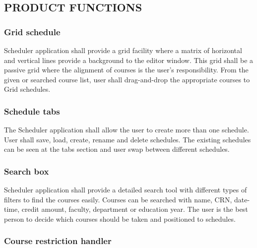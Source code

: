 \documentclass[twoside,letterpaper]{article}
\begin{document}
\subsection[PRODUCT
FUNCTIONS]{\rmfamily\bfseries\color{black}
PRODUCT FUNCTIONS}

\subsubsection[Grid schedules
]{\rmfamily\bfseries\color{black}
Grid schedule}

{\color{black}
Scheduler application shall provide a grid facility where a matrix of horizontal and vertical lines provide a background to the editor window. This grid shall be a passive grid where the alignment of courses is the user's responsibility. From the given or searched course list, user shall drag-and-drop the appropriate courses to Grid schedules. }


\subsubsection[Schedule tabs
]{\rmfamily\bfseries\color{black}
	Schedule tabs}

{\color{black}
	The Scheduler application shall allow the user to create more than one schedule. User shall save, load, create, rename and delete schedules. The existing schedules can be seen at the tabs section and user swap between different schedules.}

\subsubsection[Search box
]{\rmfamily\bfseries\color{black}
	Search box}

{\color{black}
	Scheduler application shall provide a detailed search tool with different types of filters to find the courses easily. Courses can be searched with name, CRN, date-time, credit amount, faculty, department or education year. The user is the best person to decide which courses should be taken and positioned to schedules. }

\subsubsection[Course restriction handler]{\rmfamily\bfseries\color{black}
	Course restriction handler}
\end{document}
